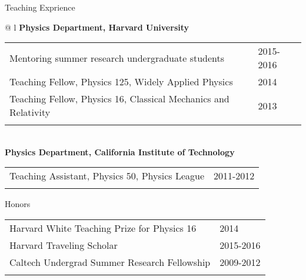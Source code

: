 \documentclass[letterpaper,11pt,oneside]{article}
\begin{document}
\raggedright
 \Large{Teaching Exprience} \\
 \normalsize
\begin{flushleft}
\hspace{1cm}
 \begin{tabular}{@{} l}
    \textbf{Physics Department, Harvard University} \\ 
    \begin{tabular}{@{} l l }
 Mentoring summer research undergraduate students & 2015-2016\\
 Teaching Fellow, Physics 125, Widely Applied Physics & 2014\\
 Teaching Fellow, Physics 16, Classical Mechanics and Relativity & 2013\\
    \hspace{0.7\linewidth} & \hspace{0.1\linewidth} \\
     \end{tabular}
     \\
     \textbf{Physics Department, California Institute of Technology} \\
     \begin{tabular}{@{} l l }
 Teaching Assistant, Physics 50, Physics League & 2011-2012\\
    \hspace{0.7\linewidth} & \hspace{0.1\linewidth} \\
      \end{tabular}
      \end{tabular}
\end{flushleft}

\raggedright
 \Large{Honors} \\
 \normalsize
\begin{flushleft}
\hspace{1cm}
\begin{tabular}{@{} l l }
 Harvard White Teaching Prize for Physics 16 & 2014\\
 Harvard Traveling Scholar & 2015-2016\\
 Caltech Undergrad Summer Research Fellowship & 2009-2012\\
    \hspace{0.7\linewidth} & \hspace{0.1\linewidth} \\
 \end{tabular}
\end{flushleft}
\end{document}
